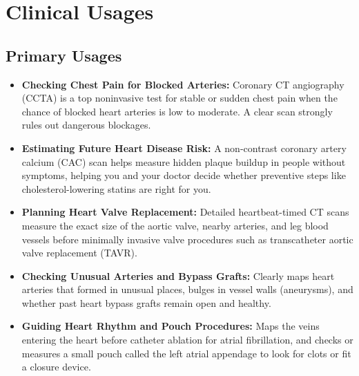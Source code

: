 \section{Clinical Usages}

\subsection{Primary Usages}
\begin{itemize}
    \item \textbf{Checking Chest Pain for Blocked Arteries:} Coronary CT angiography (CCTA) is a top noninvasive test for stable or sudden chest pain when the chance of blocked heart arteries is low to moderate. A clear scan strongly rules out dangerous blockages.
    \item \textbf{Estimating Future Heart Disease Risk:} A non-contrast coronary artery calcium (CAC) scan helps measure hidden plaque buildup in people without symptoms, helping you and your doctor decide whether preventive steps like cholesterol-lowering statins are right for you.
    \item \textbf{Planning Heart Valve Replacement:} Detailed heartbeat-timed CT scans measure the exact size of the aortic valve, nearby arteries, and leg blood vessels before minimally invasive valve procedures such as transcatheter aortic valve replacement (TAVR).
    \item \textbf{Checking Unusual Arteries and Bypass Grafts:} Clearly maps heart arteries that formed in unusual places, bulges in vessel walls (aneurysms), and whether past heart bypass grafts remain open and healthy.
    \item \textbf{Guiding Heart Rhythm and Pouch Procedures:} Maps the veins entering the heart before catheter ablation for atrial fibrillation, and checks or measures a small pouch called the left atrial appendage to look for clots or fit a closure device.
\end{itemize}

